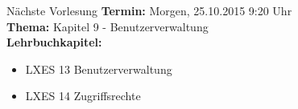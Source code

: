 \documentclass[aspectratio=43]{beamer}
\begin{document}
\begin{frame}[plain]
  \begin{alertblock}{Nächste Vorlesung}
    \textbf{Termin:} Morgen, 25.10.2015 9:20 Uhr\\
    \textbf{Thema:} Kapitel 9 - Benutzerverwaltung \\
    \textbf{Lehrbuchkapitel:} 
    \begin{itemize}
      \item LXES 13 Benutzerverwaltung
      \item LXES 14 Zugriffsrechte
    \end{itemize}
  \end{alertblock}
\end{frame}



\materialframe
\versionframe
\end{document}
